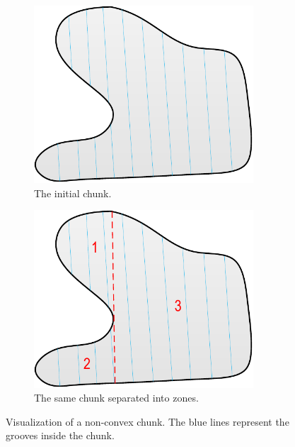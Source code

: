 \begin{figure}[!ht]
\centering
    \begin{subfigure}[t]{0.45\textwidth}
    \centering
    \includegraphics[width=0.9\textwidth]{images/chunk-concave}
    \caption{The initial chunk.}
    \label{fig:chunkdef}
    \end{subfigure}
    \begin{subfigure}[t]{0.45\textwidth}
    \centering
    \includegraphics[width=0.9\textwidth]{images/chunk-zones}
    \caption{The same chunk separated into zones.}
    \label{fig:chunkzones}
    \end{subfigure}
    \caption[Visualization of a non-convex chunk.]
    {Visualization of a non-convex chunk. The blue lines represent the grooves inside the chunk.}
    \label{fig:chunkconcave}
\end{figure}

